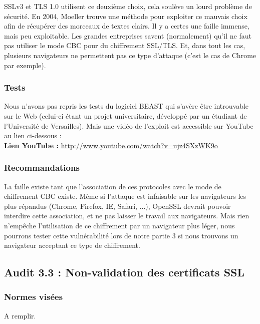 			SSLv3 et TLS 1.0 utilisent ce deuxième choix, cela soulève un lourd problème de sécurité.	En 2004, Moeller \cite{moeller2004cbc} trouve une méthode pour exploiter ce mauvais choix afin de récupérer des morceaux de textes clairs. Il y a certes une faille immense, mais peu exploitable. Les grandes entreprises savent (normalement) qu'il ne faut pas utiliser le mode CBC pour du chiffrement SSL/TLS. Et, dans tout les cas, plusieurs navigateurs ne permettent pas ce type d'attaque (c'est le cas de Chrome par exemple).
			
		\subsubsection{Tests}
			
			Nous n'avons pas repris les tests du logiciel BEAST qui s'avère être introuvable sur le Web (celui-ci étant un projet universitaire, développé par un étudiant de l'Université de Versailles). Mais une vidéo de l'exploit est accessible sur YouTube au lien ci-dessous : \\
			
			\textbf{Lien YouTube : } \href{http://www.youtube.com/watch?v=ujz4SXzWK9o} {http://www.youtube.com/watch?v=ujz4SXzWK9o}
		
		\subsubsection{Recommandations}

			La faille existe tant que l'association de ces protocoles avec le mode de chiffrement CBC existe. Même si l'attaque est infaisable sur les navigateurs les plus répandus (Chrome, Firefox, IE, Safari, ...), OpenSSL devrait pouvoir interdire cette association, et ne pas laisser le travail aux navigateurs. 	Mais rien n'empêche l'utilisation de ce chiffrement par un navigateur plus léger, nous pourrons tester cette vulnérabilité lors de notre partie 3 si nous trouvons un navigateur acceptant ce type de chiffrement.				
			
	\subsection{Audit 3.3 : Non-validation des certificats SSL}
		\subsubsection{Normes visées}
	
			A remplir.

